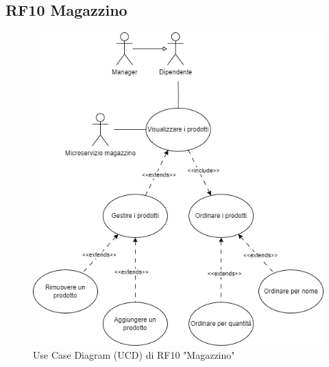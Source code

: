 \documentclass{report}
\begin{document}
\subsection*{RF10 Magazzino}
\begin{figure}[H]
	\centering\includegraphics[width=1\textwidth]{images/UCD/RF10_magazzino_UCD.png}
	Use Case Diagram (UCD) di RF10 "Magazzino"
\end{figure}
\end{document}
